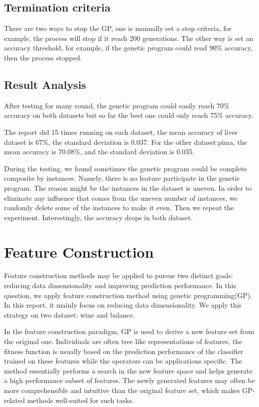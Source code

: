 \documentclass[11pt, a4paper, oneside, openright]{article}
\begin{document}
\subsection{Termination criteria}
There are two ways to stop the GP, one is manually set a stop criteria, for example, the process will stop if it reach 200 generations. The other way is set an accuracy threshold, for example, if the genetic program could read 90\% accuracy, then the process stopped.
\subsection{Result Analysis}
After testing for many round, the genetic program could easily reach 70\% accuracy on both datasets but so far the best one could only reach 75\% accuracy.

The report did 15 times running on each dataset,  the mean accuracy of liver dataset is 67\%, the standard deviation is 0.037.          
For the other dataset:pima, the mean accuracy is 70.08\%, and the standard deviation is 0.035.


During the testing, we found sometimes the genetic program could be complete composite by instances. Namely, there is no feature participate in the genetic program.  The reason might be the instances in the dataset is uneven. In order to eliminate any influence that comes from the uneven number of instances, we randomly delete some of the instances to make it even. Then we repeat the experiment. Interestingly, the accuracy drops in both dataset.

\section{Feature Construction}
Feature construction methods may be applied to pursue two distinct goals: reducing data dimensionality and improving prediction performance. In this question, we apply feature construction method using genetic programming(GP). In this report, it mainly focus on reducing data dimensionality. We apply this strategy on two dataset: wine and balance.


In the feature construction paradigm, GP is used to derive a new feature set from the original one. Individuals are often tree like representations of features, the fitness function is usually based on the prediction performance of the classifier trained on these features while the operators can be applications specific. The method essentially performs a search in the new feature space and helps generate a high performance subset of features. The newly generated features may often be more comprehensible and intuitive than the original feature set, which makes GP-related methods well-suited for such tasks.
\end{document}
